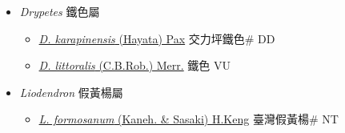 
  \begin{itemize}
 \item[] \textit{Drypetes} 鐵色屬
                    
  \begin{itemize}
        \item[] \href{http://www.theplantlist.org/tpl1.1/search?q=Drypetes+karapinensis}{\textit{D. karapinensis} (Hayata) Pax}   交力坪鐵色\# DD
        \item[] \href{http://www.theplantlist.org/tpl1.1/search?q=Drypetes+littoralis}{\textit{D. littoralis} (C.B.Rob.) Merr.}   鐵色 VU
  \end{itemize}
 \item[] \textit{Liodendron} 假黃楊屬
                    
  \begin{itemize}
        \item[] \href{http://www.theplantlist.org/tpl1.1/search?q=Liodendron+formosanum}{\textit{L. formosanum} (Kaneh. \& Sasaki) H.Keng}   臺灣假黃楊\# NT
  \end{itemize}
  \end{itemize}

